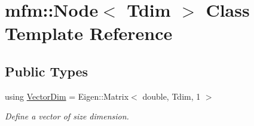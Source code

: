 \hypertarget{classmfm_1_1_node}{}\section{mfm\+:\+:Node$<$ Tdim $>$ Class Template Reference}
\label{classmfm_1_1_node}
\subsection*{Public Types}
\begin{DoxyCompactItemize}
\item 
\mbox{\label{classmfm_1_1_node_a528ae22876ff7f38409424f9db181727}} 
using \hyperlink{classmfm_1_1_node_a528ae22876ff7f38409424f9db181727}{Vector\+Dim} = Eigen\+::\+Matrix$<$ double, Tdim, 1 $>$
\begin{DoxyCompactList}\small\item\em Define a vector of size dimension. \end{DoxyCompactList}\end{DoxyCompactItemize}
